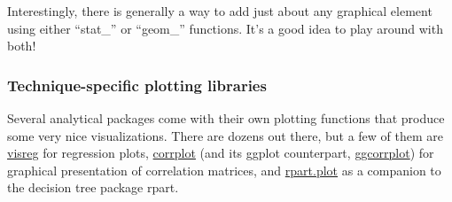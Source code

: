 \documentclass[
]{article}
\begin{document}
Interestingly, there is generally a way to add just about any graphical
element using either ``stat\_'' or ``geom\_'' functions. It's a good
idea to play around with both!

\hypertarget{technique-specific-plotting-libraries}{%
\subsubsection{Technique-specific plotting
libraries}\label{technique-specific-plotting-libraries}}

Several analytical packages come with their own plotting functions that
produce some very nice visualizations. There are dozens out there, but a
few of them are
\href{https://cran.r-project.org/web/packages/visreg/visreg.pdf}{visreg}
for regression plots,
\href{https://cran.r-project.org/web/packages/corrplot/index.html}{corrplot}
(and its ggplot counterpart,
\href{http://www.sthda.com/english/wiki/ggcorrplot-visualization-of-a-correlation-matrix-using-ggplot2}{ggcorrplot})
for graphical presentation of correlation matrices, and
\href{https://cran.r-project.org/web/packages/rpart.plot/index.html}{rpart.plot}
as a companion to the decision tree package rpart.
\end{document}
